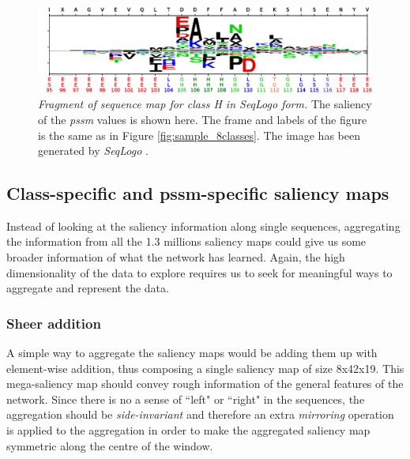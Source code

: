 	\begin{figure}
	\centering
	\includegraphics[width=1\linewidth]{Figures/sample_Hclass}
	\caption{\textit{Fragment of sequence map for class H in SeqLogo form.} The saliency of the \textit{pssm} values is shown here. The frame and labels of the figure is the same as in Figure \ref{fig:sample_8classes}. The image has been generated by \textit{SeqLogo} \cite{Thomsen2012}.}
	\label{fig:sample_Hclass}
	\end{figure}

	

	\subsection{Class-specific and pssm-specific saliency maps}
	Instead of looking at the saliency information along single sequences, aggregating the information from all the 1.3 millions saliency maps could give us some broader information of what the network has learned. Again, the high dimensionality of the data to explore requires us to seek for meaningful ways to aggregate and represent the data.
	
		\subsubsection*{Sheer addition} \label{sect:sheer}
		A simple way to aggregate the saliency maps would be adding them up with element-wise addition, thus composing a single saliency map of size 8x42x19. This mega-saliency map should convey rough information of the general features of the network. Since there is no a sense of ``left" or ``right" in the sequences, the aggregation should be \textit{side-invariant} and therefore an extra \textit{mirroring} operation is applied to the aggregation in order to make the aggregated saliency map symmetric along the centre of the window.
		
